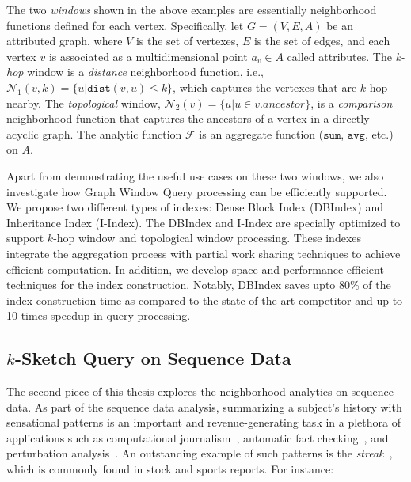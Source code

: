 
The two \emph{windows} shown in the above examples are essentially neighborhood functions defined for each vertex. Specifically, let $G=(V,E,A)$ be an attributed graph, where $V$ is the set of vertexes, $E$ is the set of edges, and each vertex $v$ is associated as a multidimensional point $a_v \in A$ called attributes.
The \emph{k-hop} window is a \emph{distance} neighborhood function, 
i.e., $\mathcal{N}_1(v,k)= \{u|\mathtt{dist}(v,u) \leq k\}$, 
which captures the vertexes that are $k$-hop nearby. 
The \emph{topological} window,  $\mathcal{N}_2(v)= \{u | u \in v.ancestor\}$,
is a \emph{comparison} neighborhood function that captures
the ancestors of a vertex in a directly acyclic graph.  The analytic function $\mathcal{F}$ is an aggregate function ($\mathtt{sum}$, $\mathtt{avg}$, etc.) on $A$.

Apart from demonstrating the useful use cases on these two windows, 
we also investigate how Graph Window Query processing can be efficiently supported.  We propose
two different types of indexes: Dense Block Index (DBIndex)
and Inheritance Index (I-Index). The DBIndex and I-Index
are specially optimized to support $k$-hop window and topological
window processing. These indexes
integrate the aggregation process with partial work sharing techniques
to achieve efficient computation.
In addition, we develop space and performance efficient techniques
for the index construction. Notably, DBIndex saves upto 80\%
of the index construction time as compared to the state-of-the-art competitor and up to 10 times
speedup in query processing. 


\subsection{$k$-Sketch Query on Sequence Data}
The second piece of this thesis explores the neighborhood analytics on sequence data. 
As part of the sequence data analysis,
summarizing a subject's history with sensational patterns
is an important and revenue-generating task in a plethora of applications 
such as computational journalism~\cite{cohen2011computational,zhang2014discovering}, automatic fact checking~\cite{hassan2014data,walenz2014finding}, and perturbation analysis~\cite{Walenz:2016:PAD:3007328.3007330}.
%
An outstanding example of such patterns is the \emph{streak}~\cite{zhang2014discovering},
which is commonly found in stock
and sports reports. For instance:

